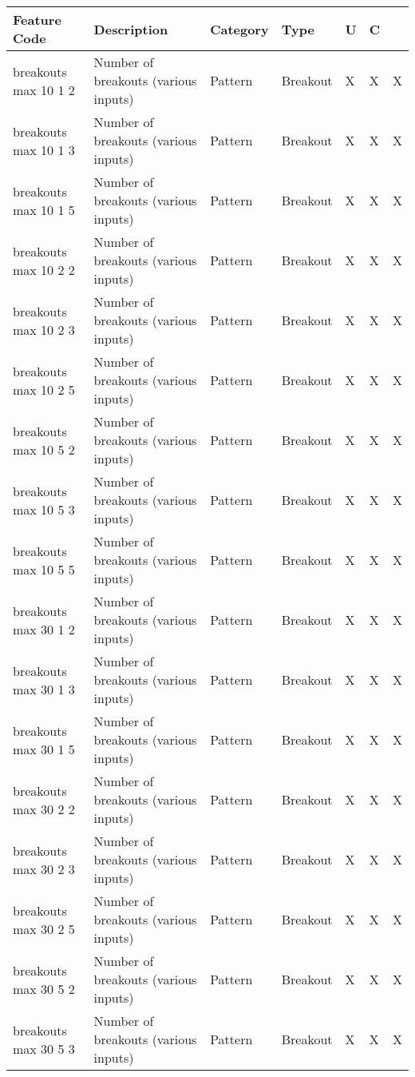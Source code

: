 {{\begin{longtable}[l]{ | p{4cm} | p{4cm} | p{1cm} | p{2cm} | p{0.3cm} | p{0.3cm} | p{0.3cm} |}
\hline
	Feature Code & Description & Category & Type & U & C &  \\ \hline
	\hline
	 breakouts max 10 1 2 & Number of breakouts (various inputs) & Pattern & Breakout & X & X & X \\ \hline
	 breakouts max 10 1 3 & Number of breakouts (various inputs) & Pattern & Breakout & X & X & X \\ \hline
	 breakouts max 10 1 5 & Number of breakouts (various inputs) & Pattern & Breakout & X & X & X \\ \hline
	 breakouts max 10 2 2 & Number of breakouts (various inputs) & Pattern & Breakout & X & X & X \\ \hline
	 breakouts max 10 2 3 & Number of breakouts (various inputs) & Pattern & Breakout & X & X & X \\ \hline
	 breakouts max 10 2 5 & Number of breakouts (various inputs) & Pattern & Breakout & X & X & X \\ \hline
	 breakouts max 10 5 2 & Number of breakouts (various inputs) & Pattern & Breakout & X & X & X \\ \hline
	 breakouts max 10 5 3 & Number of breakouts (various inputs) & Pattern & Breakout & X & X & X \\ \hline
	 breakouts max 10 5 5 & Number of breakouts (various inputs) & Pattern & Breakout & X & X & X \\ \hline
	 breakouts max 30 1 2 & Number of breakouts (various inputs) & Pattern & Breakout & X & X & X \\ \hline
	 breakouts max 30 1 3 & Number of breakouts (various inputs) & Pattern & Breakout & X & X & X \\ \hline
	 breakouts max 30 1 5 & Number of breakouts (various inputs) & Pattern & Breakout & X & X & X \\ \hline
	 breakouts max 30 2 2 & Number of breakouts (various inputs) & Pattern & Breakout & X & X & X \\ \hline
	 breakouts max 30 2 3 & Number of breakouts (various inputs) & Pattern & Breakout & X & X & X \\ \hline
	 breakouts max 30 2 5 & Number of breakouts (various inputs) & Pattern & Breakout & X & X & X \\ \hline
	 breakouts max 30 5 2 & Number of breakouts (various inputs) & Pattern & Breakout & X & X & X \\ \hline
	 breakouts max 30 5 3 & Number of breakouts (various inputs) & Pattern & Breakout & X & X & X \\ \hline

\end{longtable}}}
